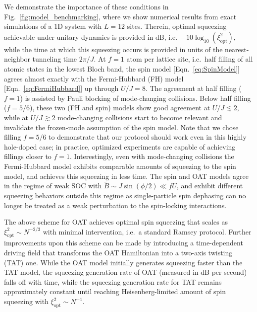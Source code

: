 \documentclass[aps,prx,superscriptaddress,twocolumn]{revtex4-2}
\renewcommand{\t}{\text} %
\begin{document}
We demonstrate the importance of these conditions in Fig.~\ref{fig:model_benchmarking}, where we show numerical results from exact simulations of a 1D system with $L=12$ sites.
Therein, optimal squeezing achievable under unitary dynamics is provided in dB, i.e.~$-10\log_{10}(\xi_{\t{opt}}^2)$, while the time at which this squeezing occurs is provided in units of the nearest-neighbor tunneling time $2\pi/J$.
At $f=1$ atom per lattice site, i.e.~half filling of all atomic states in the lowest Bloch band, the spin model [Eqn.~\eqref{eq:SpinModel}] agrees almost exactly with the Fermi-Hubbard (FH) model [Eqn.~\eqref{eq:FermiHubbard}] up through $U/J=8$. The agreement at half filling ($f=1$) is assisted by Pauli blocking of mode-changing collisions.
Below half filling ($f=5/6$), these two (FH and spin) models show good agreement at $U/J\lesssim2$, while at $U/J\gtrsim2$ mode-changing collisions start to become relevant and invalidate the frozen-mode assumption of the spin model.
Note that we chose filling $f=5/6$ to demonstrate that our protocol should work even in this highly hole-doped case; in practice, optimized experiments are capable of achieving fillings closer to $f=1$\cite{brown2017spinimbalance}.
Interestingly, even with mode-changing collisions the Fermi-Hubbard model exhibits comparable amounts of squeezing to the spin model, and achieves this squeezing in less time.
The spin and OAT models agree in the regime of weak SOC with $\widetilde{B}\sim J\sin(\phi/2)\ll fU$, and exhibit different squeezing behaviors outside this regime as single-particle spin dephasing can no longer be treated as a weak perturbation to the spin-locking  interactions.

The above scheme for OAT achieves optimal spin squeezing that scales as $\xi^2_{\t{opt}}\sim N^{-2/3}$ with minimal intervention, i.e.~a standard Ramsey protocol.
Further improvements upon this scheme can be made by introducing a time-dependent driving field that transforms the OAT Hamiltonian into a two-axis twisting (TAT) one.
While the OAT model initially generates squeezing faster than the TAT model, the squeezing generation rate of OAT (measured in dB per second) falls off with time, while the squeezing generation rate for TAT remains approximately constant until reaching Heisenberg-limited amount of spin squeezing with $\xi^2_{\t{opt}}\sim N^{-1}$\cite{kitagawa1993squeezed, supplementary_material}.
\end{document}
